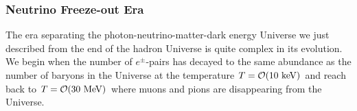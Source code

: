 \subsubsection{Neutrino Freeze-out Era }\label{nudecoup}
The era separating the photon-neutrino-matter-dark energy Universe we just described from the end of the hadron Universe is quite complex in its evolution.   We begin when the number of $e^\pm$-pairs has decayed to the same abundance as the number of baryons in the Universe at the temperature  $T=\mathcal{O}(10\text{ keV})$ and reach back to $T={\cal O}(30\MeV)$ where muons and pions are disappearing from the Universe.

\begin{figure}
\begin{minipage}{\linewidth}

\end{minipage}
\end{figure}
